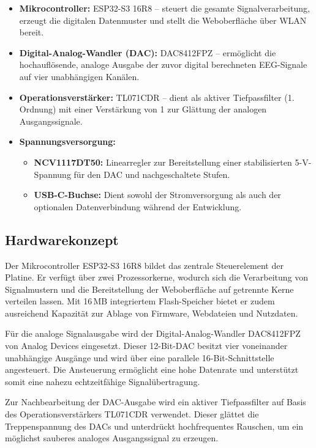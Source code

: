 \begin{itemize}
  \item \textbf{Mikrocontroller:} ESP32-S3 16R8 – steuert die gesamte Signalverarbeitung, erzeugt die digitalen Datenmuster und stellt die Weboberfläche über WLAN bereit.
  \item \textbf{Digital-Analog-Wandler (DAC):} DAC8412FPZ – ermöglicht die hochauflösende, analoge Ausgabe der zuvor digital berechneten EEG-Signale auf vier unabhängigen Kanälen.
  \item \textbf{Operationsverstärker:} TL071CDR – dient als aktiver Tiefpassfilter (1. Ordnung) mit einer Verstärkung von 1 zur Glättung der analogen Ausgangssignale.
  \item \textbf{Spannungsversorgung:}
  \begin{itemize}
    \item \textbf{NCV1117DT50:} Linearregler zur Bereitstellung einer stabilisierten 5-V-Spannung für den DAC und nachgeschaltete Stufen.
    \item \textbf{USB-C-Buchse:} Dient sowohl der Stromversorgung als auch der optionalen Datenverbindung während der Entwicklung.
  \end{itemize}
\end{itemize}


\subsection{Hardwarekonzept}

Der Mikrocontroller ESP32-S3 16R8 bildet das zentrale Steuerelement der Platine. Er verfügt über zwei Prozessorkerne, wodurch sich die Verarbeitung von Signalmustern und die Bereitstellung der Weboberfläche auf getrennte Kerne verteilen lassen. Mit 16\,MB integriertem Flash-Speicher bietet er zudem ausreichend Kapazität zur Ablage von Firmware, Webdateien und Nutzdaten.

Für die analoge Signalausgabe wird der Digital-Analog-Wandler DAC8412FPZ von Analog Devices eingesetzt. Dieser 12-Bit-DAC besitzt vier voneinander unabhängige Ausgänge und wird über eine parallele 16-Bit-Schnittstelle angesteuert. Die Ansteuerung ermöglicht eine hohe Datenrate und unterstützt somit eine nahezu echtzeitfähige Signalübertragung.

Zur Nachbearbeitung der DAC-Ausgabe wird ein aktiver Tiefpassfilter auf Basis des Operationsverstärkers TL071CDR verwendet. Dieser glättet die Treppenspannung des DACs und unterdrückt hochfrequentes Rauschen, um ein möglichst sauberes analoges Ausgangssignal zu erzeugen.

